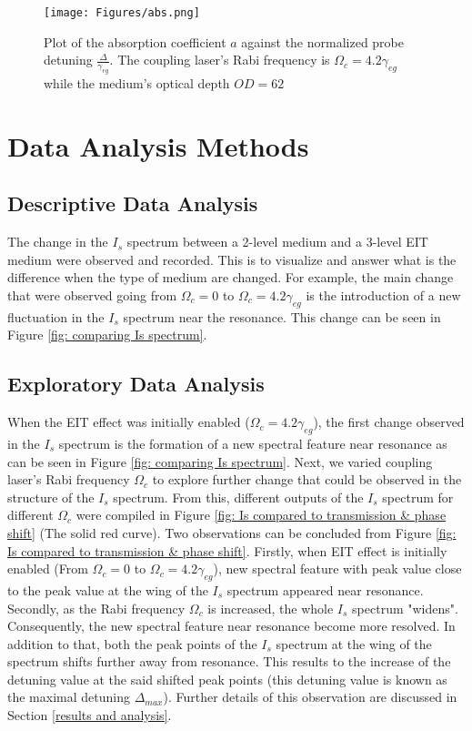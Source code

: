 \begin{figure}
    \centering
    \texttt{[image: Figures/abs.png]}
    \caption[Plot of Absorption Coefficient As A Function of Incident Probe Laser Detuning]{Plot of the absorption coefficient $a$ against the normalized probe detuning $\frac{\Delta}{\gamma_{eg}}$. The coupling laser's Rabi frequency is $\Omega_{c} = 4.2\gamma_{eg}$ while the medium's optical depth $OD = 62$}
    \label{fig: abs}
\end{figure}


\section{Data Analysis Methods}
\subsection{Descriptive Data Analysis}
The change in the $I_{s}$ spectrum between a 2-level medium and a 3-level EIT medium were observed and recorded. This is to visualize and answer what is the difference when the type of medium are changed. For example, the main change that were observed going from $\Omega_{c} = 0$ to $\Omega_{c} = 4.2\gamma_{eg}$ is the introduction of a new fluctuation in the $I_{s}$ spectrum near the resonance. This change can be seen in Figure \ref{fig: comparing Is spectrum}. 

\subsection{Exploratory Data Analysis}
When the EIT effect was initially enabled ($\Omega_{c} = 4.2\gamma_{eg}$), the first change observed in the $I_{s}$ spectrum is the formation of a new spectral feature near resonance as can be seen in Figure \ref{fig: comparing Is spectrum}. Next, we varied coupling laser's Rabi frequency $\Omega_{c}$ to explore further change that could be observed in the structure of the $I_{s}$ spectrum. From this, different outputs of the $I_{s}$ spectrum for different $\Omega_{c}$ were compiled in Figure \ref{fig: Is compared to transmission & phase shift} (The solid red curve). Two observations can be concluded from Figure \ref{fig: Is compared to transmission & phase shift}. Firstly, when EIT effect is initially enabled (From $\Omega_{c} = 0$ to $\Omega_{c} = 4.2\gamma_{eg}$), new spectral feature with peak value close to the peak value at the wing of the $I_{s}$ spectrum appeared near resonance. Secondly, as the Rabi frequency $\Omega_{c}$ is increased, the whole $I_{s}$ spectrum "widens". Consequently, the new spectral feature near resonance become more resolved. In addition to that, both the peak points of the $I_{s}$ spectrum at the wing of the spectrum shifts further away from resonance. This results to the increase of the detuning value at the said shifted peak points (this detuning value is known as the maximal detuning $\Delta_{max}$). Further details of this observation are discussed in Section \ref{results and analysis}.



